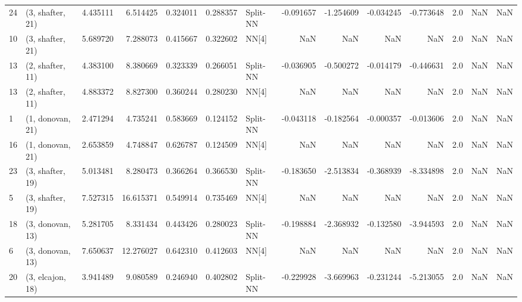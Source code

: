 \begin{tabular}{llrrrrlrrrrrrl}
24 &  (3, shafter, 21) &   4.435111 &   6.514425 &   0.324011 &  0.288357 &    Split-NN &       -0.091657 &     -1.254609 &      -0.034245 &    -0.773648 &            2.0 &    NaN &              NaN \\
10 &  (3, shafter, 21) &   5.689720 &   7.288073 &   0.415667 &  0.322602 &       NN[4] &             NaN &           NaN &            NaN &          NaN &            2.0 &    NaN &              NaN \\
13 &  (2, shafter, 11) &   4.383100 &   8.380669 &   0.323339 &  0.266051 &    Split-NN &       -0.036905 &     -0.500272 &      -0.014179 &    -0.446631 &            2.0 &    NaN &              NaN \\
13 &  (2, shafter, 11) &   4.883372 &   8.827300 &   0.360244 &  0.280230 &       NN[4] &             NaN &           NaN &            NaN &          NaN &            2.0 &    NaN &              NaN \\
1  &  (1, donovan, 21) &   2.471294 &   4.735241 &   0.583669 &  0.124152 &    Split-NN &       -0.043118 &     -0.182564 &      -0.000357 &    -0.013606 &            2.0 &    NaN &              NaN \\
16 &  (1, donovan, 21) &   2.653859 &   4.748847 &   0.626787 &  0.124509 &       NN[4] &             NaN &           NaN &            NaN &          NaN &            2.0 &    NaN &              NaN \\
23 &  (3, shafter, 19) &   5.013481 &   8.280473 &   0.366264 &  0.366530 &    Split-NN &       -0.183650 &     -2.513834 &      -0.368939 &    -8.334898 &            2.0 &    NaN &              NaN \\
5  &  (3, shafter, 19) &   7.527315 &  16.615371 &   0.549914 &  0.735469 &       NN[4] &             NaN &           NaN &            NaN &          NaN &            2.0 &    NaN &              NaN \\
18 &  (3, donovan, 13) &   5.281705 &   8.331434 &   0.443426 &  0.280023 &    Split-NN &       -0.198884 &     -2.368932 &      -0.132580 &    -3.944593 &            2.0 &    NaN &              NaN \\
6  &  (3, donovan, 13) &   7.650637 &  12.276027 &   0.642310 &  0.412603 &       NN[4] &             NaN &           NaN &            NaN &          NaN &            2.0 &    NaN &              NaN \\
20 &  (3, elcajon, 18) &   3.941489 &   9.080589 &   0.246940 &  0.402802 &    Split-NN &       -0.229928 &     -3.669963 &      -0.231244 &    -5.213055 &            2.0 &    NaN &              NaN \\

\end{tabular}
